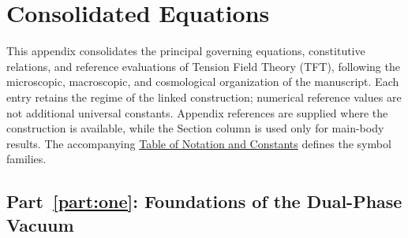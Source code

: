 \chapter*{Consolidated Equations}
\label{app:consolidated_equations}

This appendix consolidates the principal governing equations, constitutive relations, and reference evaluations of Tension Field Theory (TFT), following the microscopic, macroscopic, and cosmological organization of the manuscript. Each entry retains the regime of the linked construction; numerical reference values are not additional universal constants. Appendix references are supplied where the construction is available, while the Section column is used only for main-body results. The accompanying \hyperref[app:notation]{Table of Notation and Constants} defines the symbol families.

\begingroup
\setlength{\tabcolsep}{2.8pt}
\renewcommand{\arraystretch}{1.6}

\par\ifdim\dimexpr\pagegoal-\pagetotal\relax<12\baselineskip\newpage\fi
\section*{Part~\ref{part:one}: Foundations of the Dual-Phase Vacuum}

